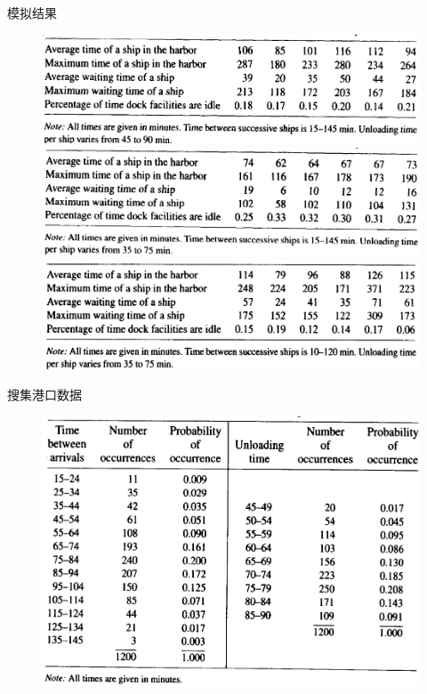 \documentclass[UTF8]{ctexbeamer}
\begin{document}
\begin{frame}{模拟结果}

  \begin{figure}
    \centering
    \includegraphics[height=.25\textheight{}]{harbor-sim.png}\\
    \includegraphics[height=.25\textheight{}]{harbor-sim2.png}\\
    \includegraphics[height=.25\textheight{}]{harbor-sim3.png}
  \end{figure}
  
\end{frame}

\begin{frame}{搜集港口数据}
  \begin{figure}
    \centering
    \includegraphics[width=.8\textwidth{}]{harbor-real.png}
  \end{figure}
  
\end{frame}
\end{document}
